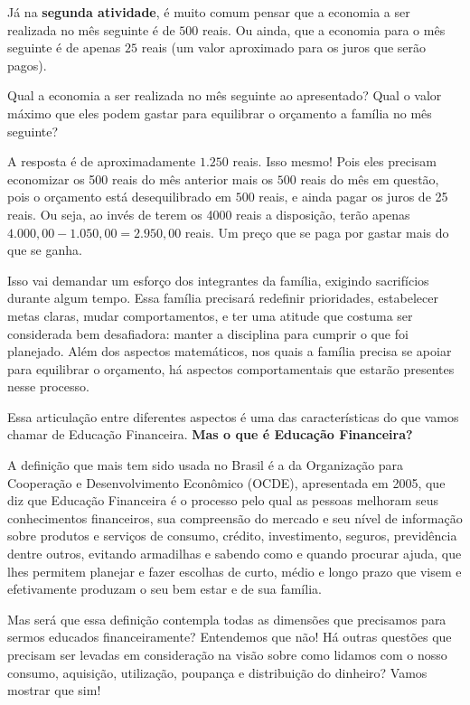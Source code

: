 Já na \textbf{segunda atividade}, é muito comum pensar que a economia a ser realizada no mês seguinte é de $500$ reais. Ou ainda, que a economia para o mês seguinte é de apenas $25$ reais (um valor aproximado para os juros que serão pagos). 


Qual a economia a ser realizada no mês seguinte ao apresentado? Qual o valor máximo que eles podem gastar para equilibrar o orçamento a família no mês seguinte? 

A resposta é de aproximadamente $1.250$ reais. Isso mesmo! Pois eles precisam economizar os 500 reais do mês anterior mais os $500$ reais do mês em questão, pois o orçamento está desequilibrado em $500$ reais, e ainda pagar os juros de 25 reais. Ou seja, ao invés de terem os 4000 reais a disposição, terão apenas $4.000{,}00 - 1.050{,}00 = 2.950{,}00$ reais. Um preço que se paga por gastar mais do que se ganha.

Isso vai demandar um esforço dos integrantes da família, exigindo sacrifícios durante algum tempo. Essa família precisará redefinir prioridades, estabelecer metas claras, mudar comportamentos, e ter uma atitude que costuma ser considerada bem desafiadora: manter a disciplina para cumprir o que foi planejado. Além dos aspectos matemáticos, nos quais a família precisa se apoiar para equilibrar o orçamento, há aspectos comportamentais que estarão presentes nesse processo.

Essa articulação entre diferentes aspectos é uma das características do que vamos chamar de Educação Financeira. \textbf{Mas o que é Educação Financeira?}

A definição que mais tem sido usada no Brasil é a da Organização para Cooperação e Desenvolvimento Econômico (OCDE), apresentada em 2005, que diz que Educação Financeira é o processo pelo qual as pessoas melhoram seus conhecimentos financeiros, sua compreensão do mercado e seu nível de informação sobre produtos e serviços de consumo, crédito, investimento, seguros, previdência dentre outros, evitando armadilhas e sabendo como e quando procurar ajuda, que lhes permitem planejar e fazer escolhas de curto, médio e longo prazo que visem e efetivamente produzam o seu bem estar e de sua família.

Mas será que essa definição contempla todas as dimensões que precisamos para sermos educados financeiramente? Entendemos que não! Há outras questões que precisam ser levadas em consideração na visão sobre como lidamos com o nosso consumo, aquisição, utilização, poupança e distribuição do dinheiro? Vamos mostrar que sim!

